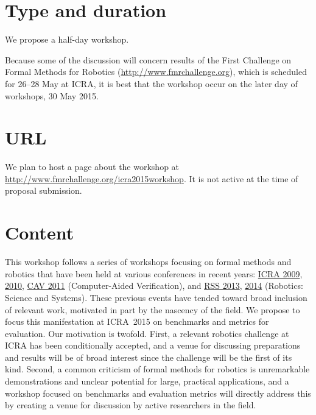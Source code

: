 \documentclass{amsart}
\begin{document}
\section{Type and duration}

We propose a half-day workshop.

Because some of the discussion will concern results of the First Challenge on
Formal Methods for Robotics (\url{http://www.fmrchallenge.org}), which is
scheduled for 26--28 May at ICRA, it is best that the workshop occur on the
later day of workshops, 30 May 2015.

\section{URL}

We plan to host a page about the workshop at \url{http://www.fmrchallenge.org/icra2015workshop}.   It is not active at the time of proposal submission.


\section{Content}

This workshop follows a series of workshops focusing on formal methods and
robotics that have been held at various conferences in recent years:
\href{http://verifiablerobotics.com/ICRA09/index.html}{ICRA 2009},
\href{http://verifiablerobotics.com/ICRA10/index.html}{2010},
\href{http://verifiablerobotics.com/CAV11/index.html}{CAV 2011} (Computer-Aided
Verification), and \href{http://verifiablerobotics.com/RSS13/index.html}{RSS
  2013}, \href{http://verifiablerobotics.com/RSS14/index.html}{2014} (Robotics:
Science and Systems).  These previous events have tended toward broad inclusion
of relevant work, motivated in part by the nascency of the field.  We propose to
focus this manifestation at ICRA~2015 on benchmarks and metrics for evaluation.
Our motivation is twofold.  First, a relevant robotics challenge at ICRA has
been conditionally accepted, and a venue for discussing preparations and results
will be of broad interest since the challenge will be the first of its kind.
Second, a common criticism of formal methods for robotics is unremarkable
demonstrations and unclear potential for large, practical applications, and a
workshop focused on benchmarks and evaluation metrics will directly address this
by creating a venue for discussion by active researchers in the field.
\end{document}
